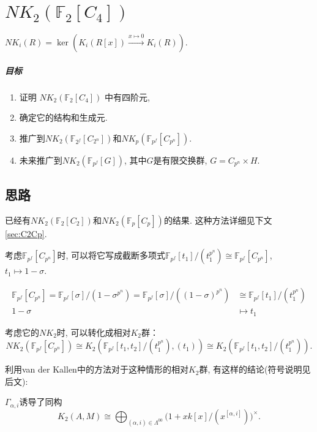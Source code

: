 \chapter{$NK_2(\mathbb{F}_2[C_4])$}

$NK_i(R)=\ker(K_i(R[x])\overset{x\mapsto 0}\longrightarrow K_i(R)). $

\paragraph{目标} %
\label{par:目标}
\begin{enumerate}
	\item 证明 $NK_2(\mathbb{F}_2[C_4])$ 中有四阶元, 
	\item 确定它的结构和生成元. 
	\item 推广到$NK_2(\mathbb{F}_{2^f}[C_{2^n}])$和$NK_p(\mathbb{F}_{p^f}[C_{p^n}])$. 
	\item 未来推广到$NK_2(\mathbb{F}_{p^f}[G])$, 其中$G$是有限交换群, $G=C_{p^n} \times H$. 
\end{enumerate}






 
\section{思路}
已经有$NK_2(\mathbb{F}_2[C_2])$和$NK_2(\mathbb{F}_p[C_p])$的结果\cite{Guin-Waléry1981}. 这种方法详细见下文\ref{sec:C2Cp}. 

考虑$\mathbb{F}_{p^f}[C_{p^n}]$时, 可以将它{\color{blue}写成截断多项式$\mathbb{F}_{p^f}[t_1]/(t_1^{p^n})\cong \mathbb{F}_{p^f}[C_{p^n}]$}, $t_1\mapsto 1-\sigma$. 

\begin{align*}
\mathbb{F}_{p^f}[C_{p^n}]=\mathbb{F}_{p^f}[\sigma]/(1-\sigma^{p^n}) = \mathbb{F}_{p^f}[\sigma]/((1-\sigma)^{p^n}) &\cong \mathbb{F}_{p^f}[t_1]/(t_1^{p^n}) \\
 1-\sigma & \mapsto t_1
\end{align*}



考虑它的$NK_2$时, 可以{\color{blue}转化成相对$K_2$群}：
\[NK_2(\mathbb{F}_{p^f}[C_{p^n}]) \cong K_2(\mathbb{F}_{p^f}[t_1, t_2]/(t_1^{p^n}), (t_1))\cong K_2(\mathbb{F}_{p^f}[t_1, t_2]/(t_1^{p^n})). \]

利用van der Kallen\cite{MR86f:18017}中的方法对于这种情形的相对$K_2$群, 有这样的结论(符号说明见后文):
\begin{theorem*}
	$\Gamma_{\alpha, i}$诱导了{\color{red}同构}
\[ K_2(A, M)\cong \bigoplus_{(\alpha, i)\in\Lambda^{00}}\big(1+xk[x]/(x^{[\alpha, i]})\big)^{\times}. \]
\end{theorem*}

